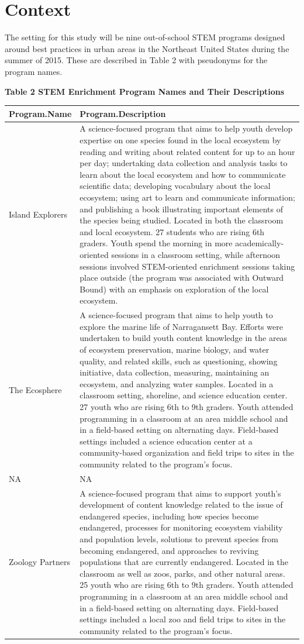 \documentclass[]{book}
\theoremstyle{definition}
\theoremstyle{definition}
\theoremstyle{definition}
\theoremstyle{remark}
\begin{document}
\section{Context}\label{context}

The setting for this study will be nine out-of-school STEM programs
designed around best practices in urban areas in the Northeast United
States during the summer of 2015. These are described in Table 2 with
pseudonyms for the program names.

\textbf{Table 2 STEM Enrichment Program Names and Their Descriptions}

\begin{tabular}{ll}
\toprule
Program.Name & Program.Description\\
\midrule
Island Explorers & A science-focused program that aims to help youth develop expertise on one species found in the local ecosystem by reading and writing about related content for up to an hour per day; undertaking data collection and analysis tasks to learn about the local ecosystem and how to communicate scientific data; developing vocabulary about the local ecosystem; using art to learn and communicate information; and publishing a book illustrating important elements of the species being studied. Located in both the classroom and local ecosystem. 27 students who are rising 6th graders. Youth spend the morning in more academically-oriented sessions in a classroom setting, while afternoon sessions involved STEM-oriented enrichment sessions taking place outside (the program was associated with Outward Bound) with an emphasis on exploration of the local ecosystem.\\
The Ecosphere & A science-focused program that aims to help youth to explore the marine life of Narragansett Bay. Efforts were undertaken to build youth content knowledge in the areas of ecosystem preservation, marine biology, and water quality, and related skills, such as questioning, showing initiative, data collection, measuring, maintaining an ecosystem, and analyzing water samples. Located in a classroom setting, shoreline, and science education center. 27 youth who are rising 6th to 9th graders. Youth attended programming in a classroom at an area middle school and in a field-based setting on alternating days. Field-based settings included a science education center at a community-based organization and field trips to sites in the community related to the program's focus.\\
NA & NA\\
Zoology Partners & A science-focused program that aims to support youth's development of content knowledge related to the issue of endangered species, including how species become endangered, processes for monitoring ecosystem viability and population levels, solutions to prevent species from becoming endangered, and approaches to reviving populations that are currently endangered. Located in the classroom as well as zoos, parks, and other natural areas. 25 youth who are rising 6th to 9th graders. Youth attended programming in a classroom at an area middle school and in a field-based setting on alternating days. Field-based settings included a local zoo and field trips to sites in the community related to the program's focus.\\

\end{tabular}
\end{document}
